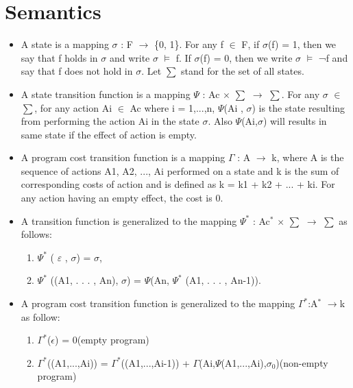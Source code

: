 \documentclass[11pt]{article}
\begin{document}
	\section{Semantics}
	\begin{itemize}
\item 	A state is a mapping $\sigma$ : F $\rightarrow$ \{0, 1\}. For any f $\in$ F, if $\sigma$(f) = 1, then we say that f holds in $\sigma$ and write $\sigma$   $\vDash$   f. If $\sigma$(f) = 0, then we write $\sigma$   $\vDash$   ¬f and say that f does not hold in $\sigma$. Let $\sum$ stand for the set of all states.

\item 	A state transition function is a mapping $\Psi$ : Ac $\times$ $\sum$ $\rightarrow$ $\sum$. For any $\sigma$ $\in$ $\sum$, for any action Ai $\in$ Ac where i = 1,...,n, $\Psi$(Ai , $\sigma$) is the state resulting from performing the action Ai in the state $\sigma$. Also $\Psi$(Ai,$\sigma$) will results in same state if the effect of action is empty.

\item A program cost transition function is a mapping $\Gamma$ : A $\rightarrow$ k, where A is the sequence of actions A1, A2, ..., Ai performed on a state and k is the sum of corresponding costs of action and is defined as k = k1 + k2 + ... + ki. For any action having an empty effect, the cost is 0.

\item 	A transition function is generalized to the mapping $\Psi^{\ast}$ : Ac$^{\ast}$  $\times$  $\sum$ $\rightarrow$ $\sum$ as follows: 
\begin{enumerate}

\item $\Psi^{\ast}$ ( $\varepsilon$ , $\sigma$) = $\sigma$,
 
\item $\Psi^{\ast}$ ((A1, . . . , An), $\sigma$) = $\Psi$(An, $\Psi^{\ast}$ (A1, . . . , An-1)). 

\end{enumerate}

\item A program cost transition function is generalized to the mapping $\Gamma^{\ast}$:A$^{\ast}$ $\rightarrow$k as follow:
\begin{enumerate}
\item $\Gamma^{\ast}$($\epsilon$) = 0(empty program)
\item $\Gamma^{\ast}$((A1,...,Ai)) = $\Gamma^{\ast}$((A1,...,Ai-1)) + $\Gamma$(Ai,$\Psi$(A1,...,Ai),$\sigma_{0}$)(non-empty program)
\end{enumerate}


\end{itemize}
\end{document}
